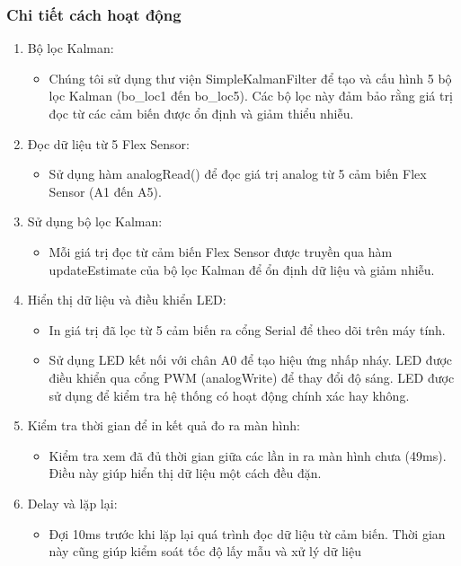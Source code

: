 \subsubsection{Chi tiết cách hoạt động}

\begin{enumerate}[-]
    \item Bộ lọc Kalman:
    \begin{itemize}
        \item Chúng tôi sử dụng thư viện SimpleKalmanFilter để tạo và cấu hình 5 bộ lọc Kalman (bo\_loc1 đến bo\_loc5). Các bộ lọc này đảm bảo rằng giá trị đọc từ các cảm biến được ổn định và giảm thiểu nhiễu.
    \end{itemize}
    \item  Đọc dữ liệu từ 5 Flex Sensor:
    \begin{itemize}
        \item Sử dụng hàm analogRead() để đọc giá trị analog từ 5 cảm biến Flex Sensor (A1 đến A5).
    \end{itemize}
    \item  Sử dụng bộ lọc Kalman:
    \begin{itemize}
        \item Mỗi giá trị đọc từ cảm biến Flex Sensor được truyền qua hàm updateEstimate của bộ lọc Kalman để ổn định dữ liệu và giảm nhiễu.
    \end{itemize}
    \item  Hiển thị dữ liệu và điều khiển LED:
    \begin{itemize}
        \item In giá trị đã lọc từ 5 cảm biến ra cổng Serial để theo dõi trên máy tính.
        \item Sử dụng LED kết nối với chân A0 để tạo hiệu ứng nhấp nháy. LED được điều khiển qua cổng PWM (analogWrite) để thay đổi độ sáng. LED được sử dụng để kiểm tra hệ thống có hoạt động chính xác hay không.
    \end{itemize}
    \item  Kiểm tra thời gian để in kết quả đo ra màn hình:
    \begin{itemize}
        \item Kiểm tra xem đã đủ thời gian giữa các lần in ra màn hình chưa (49ms). Điều này giúp hiển thị dữ liệu một cách đều đặn.
    \end{itemize}
    \item  Delay và lặp lại:
    \begin{itemize}
        \item Đợi 10ms trước khi lặp lại quá trình đọc dữ liệu từ cảm biến. Thời gian này cũng giúp kiểm soát tốc độ lấy mẫu và xử lý dữ liệu
    \end{itemize}
\end{enumerate}



